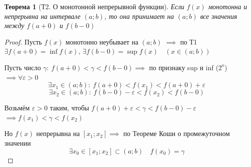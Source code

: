 \documentclass[a4paper,oneside]{article}
\newcommand{\prop}[1]{#1^{\text{o}}}
\newcommand{\eps}{\varepsilon}
\newtheorem{theorem}{Теорема}[subsection]
\theoremstyle{definition}
\theoremstyle{definition}
\theoremstyle{definition}
\begin{document}
\begin{theorem}[Т2. О монотонной непрерывной функции]
    Если $f(x)$ монотонна и непрерывна на интервале $(a; b)$, то она принимает на $(a; b)$
    все значения между $f(a + 0)$ и $f(b - 0)$
\end{theorem}
\begin{proof}
    Пусть $f(x)$ монотонно неубывает на $(a; b)$ $\implies$
    по Т1 $\exists f(a + 0) = \inf f(x), \, \exists f(b - 0) = \sup f(x) \quad (x \in (a; b))$

    Пусть число $\gamma:\: f(a + 0) < \gamma < f(b - 0) \implies$ по признаку sup и inf ($\prop{2}$)
    $\implies \forall \eps > 0$
    \[ \exists x_1 \in (a; b): \: f(a + 0) < f(x_1) < f(a + 0) + \eps \]
    \[ \exists x_2 \in (a; b): \: f(b - 0) - \eps < f(x_2) < f(b - 0) \]

    Возьмём $\eps > 0$ таким, чтобы $f(a + 0) + \eps < \gamma < f(b - 0) - \eps$
    $\implies f(x_1) < \gamma < f(x_2)$

    Но $f(x)$ непрерывна на $[x_1; x_2] \implies$ по Теореме Коши о промежуточном значении
    \[ \exists x_0 \in [x_1; x_2] \subset (a; b) \quad f(x_0) = \gamma \]
\end{proof}
\end{document}
